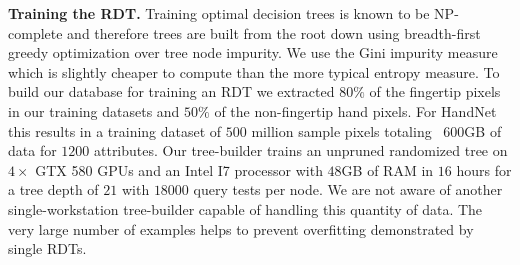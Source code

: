 \documentclass{bmvc2k}
\begin{document}
\textbf{Training the RDT.}
Training optimal decision trees is known to be NP-complete \cite{HyafilR76} and therefore trees are built from the root down using breadth-first greedy optimization over tree node impurity. We use the Gini impurity measure which is slightly cheaper to compute than the more typical entropy measure. To build our database for training an RDT we extracted $80\%$ of the fingertip pixels in our training datasets and $50\%$ of the non-fingertip hand pixels. For HandNet this results in a training dataset of $500$ million sample pixels totaling ~$600$GB of data for $1200$ attributes. Our tree-builder trains an unpruned randomized tree on $4\times$ GTX 580 GPUs and an Intel I7  processor with $48$GB of RAM in $16$ hours for a tree depth of $21$ with $18000$ query tests per node. We are not aware of another single-workstation tree-builder capable of handling this quantity of data. The very large number of examples helps to prevent overfitting demonstrated by single RDTs.
\end{document}
